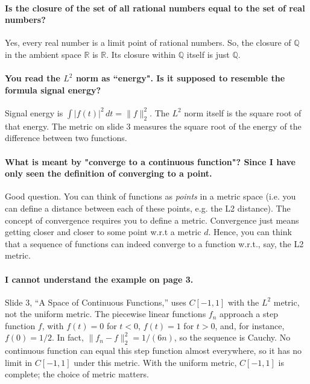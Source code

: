 \documentclass[10pt,english]{article}
\begin{document}
\paragraph{Is the closure of the set of all rational numbers equal to the set of real numbers?}
Yes, every real number is a limit point of rational numbers.
So, the closure of $\mathbb{Q}$ in the ambient space $\mathbb{R}$ is $\mathbb{R}$. Its closure within $\mathbb{Q}$ itself is just $\mathbb{Q}$.

\paragraph{You read the $L^2$ norm as ``energy". Is it supposed to resemble the formula signal energy?}

Signal energy is $\int |f(t)|^2\,dt=\|f\|_2^2$.
The $L^2$ norm itself is the square root of that energy.
The metric on slide 3 measures the square root of the energy of the difference between two functions.


\paragraph{What is meant by "converge to a continuous function"? Since I have only seen the definition of converging to a point.}

Good question. You can think of functions as \textit{points} in a metric space (i.e. you can define a distance between each of these points, e.g. the L2 distance). The concept of convergence requires you to define a metric. Convergence just means getting closer and closer to some point w.r.t a metric $d$. Hence, you can think that a sequence of functions can indeed converge to a function w.r.t., say, the L2 metric.


\paragraph{I cannot understand the example on page 3.}


Slide 3, ``A Space of Continuous Functions,'' uses $C[-1,1]$ with the $L^2$ metric, not the uniform metric.
The piecewise linear functions $f_n$ approach a step function $f$, with $f(t)=0$ for $t<0$, $f(t)=1$ for $t>0$, and, for instance, $f(0)=1/2$.
In fact, $\|f_n-f\|_2^2=1/(6n)$, so the sequence is Cauchy.
No continuous function can equal this step function almost everywhere, so it has no limit in $C[-1,1]$ under this metric.
With the uniform metric, $C[-1,1]$ is complete; the choice of metric matters.
\end{document}
